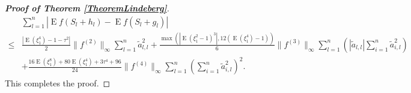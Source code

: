 \documentclass[11pt]{article}
\DeclareMathOperator{\myE}{E}
\theoremstyle{plain}
\theoremstyle{definition}
\theoremstyle{remark}
\begin{document}
\begin{appendices}
\begin{proof}[\textbf{Proof of Theorem \ref{TheoremLindeberg}}]
    \begin{equation*}
        \begin{split}
             &
             \sum_{l=1}^n \left| \myE f(S_{l}+h_{l})-\myE f(S_{l}+g_{l})\right|
             \\
\leq&
\frac{
\left|
\myE (\xi_1^4)-1
            -
            \tau^2
\right|
}{2}
\|f^{(2)}\|_\infty
\sum_{l=1}^n \tilde a_{l,l}^2
            +
            \frac{
            \max\left(
    \left|\myE (\xi_1^2-1)^3\right|
            ,
12 (\myE (\xi_1^4)-1)
        \right)
            }{6} \|f^{(3)}\|_\infty
            \sum_{l=1}^n 
            \left(|\tilde a_{l,l}|
         \sum_{i=1}^{n} \tilde a_{i,l}^2 
     \right)
         \\
            &+
            \frac{
             16 \myE (\xi_1^8) + 80 \myE (\xi_1^4) + 3\tau^4 + 96 
            }{24} \|f^{(4)} \|_{\infty} 
            \sum_{l=1}^n \left( \sum_{i=1}^n \tilde a_{i,l}^2 \right)^2
            .
        \end{split}
    \end{equation*}
    This completes the proof.
 
\end{proof}



\end{appendices}
\end{document}
